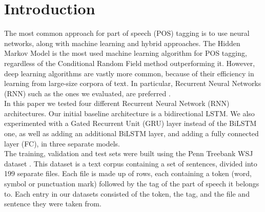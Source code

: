 \documentclass[11pt]{article}
\begin{document}
\section{Introduction}
\label{sec:introduction}
The most common approach for part of speech (POS) tagging is to use neural networks, along with machine learning and hybrid approaches. The Hidden Markov Model is the most used machine learning algorithm for POS tagging, regardless of the Conditional Random Field method outperforming it. However, deep learning algorithms are vastly more common, because of their efficiency in learning from large-size corpora of text. In particular, Recurrent Neural Networks (RNN) such as the ones we evaluated, are preferred \cite{metareview}.\\
In this paper we tested four different Recurrent Neural Network (RNN) architectures. Our initial baseline architecture is a bidirectional LSTM. We also experimented with a Gated Recurrent Unit (GRU) layer instead of the BiLSTM one, as well as adding an additional BiLSTM layer, and adding a fully connected layer (FC), in three separate models.\\
The training, validation and test sets were built using the Penn Treebank WSJ dataset \cite{penntreebank}. This dataset is a text corpus containing a set of sentences, divided into 199 separate files. Each file is made up of rows, each containing a token (word, symbol or punctuation mark) followed by the tag of the part of speech it belongs to. Each entry in our datasets consisted of the token, the tag, and the file and sentence they were taken from.



\end{document}
